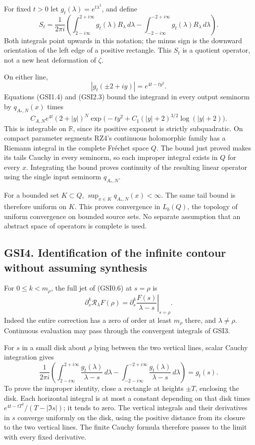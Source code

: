 For fixed \(t>0\) let \(g_t(\lambda)=e^{t\lambda^2}\), and define \[
S_t=\frac1{2\pi i}\left(
\int_{2-i\infty}^{2+i\infty}g_t(\lambda)R_\lambda\,d\lambda
-\int_{-2-i\infty}^{-2+i\infty}g_t(\lambda)R_\lambda\,d\lambda
\right).
\tag{GSI3.1}
\] Both integrals point upwards in this notation; the minus sign is the
downward orientation of the left edge of a positive rectangle. This
\(S_t\) is a quotient operator, not a new heat deformation of \(\zeta\).

On either line, \[
|g_t(\pm2+iy)|=e^{4t-ty^2}.
\tag{GSI3.2}
\] Equations (GSI1.4) and (GSI2.3) bound the integrand in every output
seminorm by \(q_{A_*,N}(x)\) times \[
C_{A,N}e^{4t}(2+|y|)^N
\exp\bigl(-ty^2+C_1(|y|+2)^{3/2}\log(|y|+2)\bigr).
\tag{GSI3.3}
\] This is integrable on \(\mathbb R\), since its positive exponent is
strictly subquadratic. On compact parameter segments RZ4's continuous
holomorphic family has a Riemann integral in the complete Fréchet space
\(Q\). The bound just proved makes its tails Cauchy in every seminorm,
so each improper integral exists in \(Q\) for every \(x\). Integrating
the bound proves continuity of the resulting linear operator using the
single input seminorm \(q_{A_*,N}\).

For a bounded set \(K\subset Q\), \(\sup_{x\in K}q_{A_*,N}(x)<\infty\).
The same tail bound is therefore uniform on \(K\). This proves
convergence in \(L_b(Q)\), the topology of uniform convergence on
bounded source sets. No separate assumption that an abstract space of
operators is complete is used.

\subsection{GSI4. Identification of the infinite contour without
assuming
synthesis}\label{gsi4.-identification-of-the-infinite-contour-without-assuming-synthesis}

For \(0\le k<m_\rho\), the full jet of (GSI0.6) at \(s=\rho\) is \[
\partial_s^k\mathscr R_\lambda F(\rho)
=\left.\partial_s^k\frac{F(s)}{\lambda-s}\right|_{s=\rho}.
\tag{GSI4.1}
\] Indeed the entire correction has a zero of order at least \(m_\rho\)
there, and \(\lambda\ne\rho\). Continuous evaluation may pass through
the convergent integrals of GSI3.

For \(s\) in a small disk about \(\rho\) lying between the two vertical
lines, scalar Cauchy integration gives \[
\frac1{2\pi i}\left(
\int_{2-i\infty}^{2+i\infty}\frac{g_t(\lambda)}{\lambda-s}\,d\lambda
-\int_{-2-i\infty}^{-2+i\infty}\frac{g_t(\lambda)}{\lambda-s}\,d\lambda
\right)=g_t(s).
\tag{GSI4.2}
\] To prove the improper identity, close a rectangle at heights
\(\pm T\), enclosing the disk. Each horizontal integral is at most a
constant depending on that disk times \(e^{4t-tT^2}/(T-|\Im s|)\); it
tends to zero. The vertical integrals and their derivatives in \(s\)
converge uniformly on the disk, using the positive distance from its
closure to the two vertical lines. The finite Cauchy formula therefore
passes to the limit with every fixed derivative.

